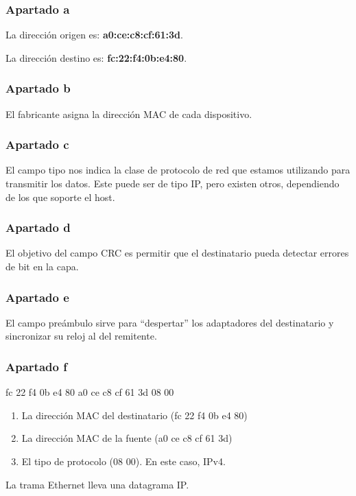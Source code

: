 \documentclass[spanish]{report} %
\begin{document}
\subsubsection{Apartado a}
La dirección origen es: \textbf{a0:ce:c8:cf:61:3d}.\newline

La dirección destino es: \textbf{fc:22:f4:0b:e4:80}.

\subsubsection{Apartado b}
El fabricante asigna la dirección MAC de cada dispositivo.

\subsubsection{Apartado c}
El campo tipo nos indica la clase de protocolo de red que estamos utilizando
para transmitir los datos. Este puede ser de tipo IP, pero existen otros,
dependiendo de los que soporte el host.


\subsubsection{Apartado d}
El objetivo del campo CRC es permitir que el destinatario pueda detectar errores
de bit en la capa.


\subsubsection{Apartado e}
El campo preámbulo sirve para ``despertar'' los adaptadores del destinatario y
sincronizar su reloj al del remitente.


\subsubsection{Apartado f}

fc 22 f4 0b e4 80 a0 ce c8 cf 61 3d 08 00\newline

\begin{enumerate}
\item La dirección MAC del destinatario (fc 22 f4 0b e4 80)
\item La dirección MAC de la fuente (a0 ce c8 cf 61 3d)
\item El tipo de protocolo (08 00). En este caso, IPv4.
\end{enumerate}
La trama Ethernet lleva una datagrama IP.
\end{document}
